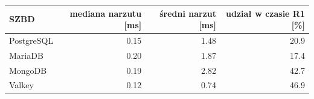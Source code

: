\begin{tabular}{lrrr}
\toprule
SZBD & mediana narzutu [ms] & średni narzut [ms] & udział w czasie R1 [\%] \\
\midrule
PostgreSQL & \num{0.15} & \num{1.48} & \num{20.9} \\
MariaDB & \num{0.20} & \num{1.87} & \num{17.4} \\
MongoDB & \num{0.19} & \num{2.82} & \num{42.7} \\
Valkey & \num{0.12} & \num{0.74} & \num{46.9} \\
\bottomrule
\end{tabular}
